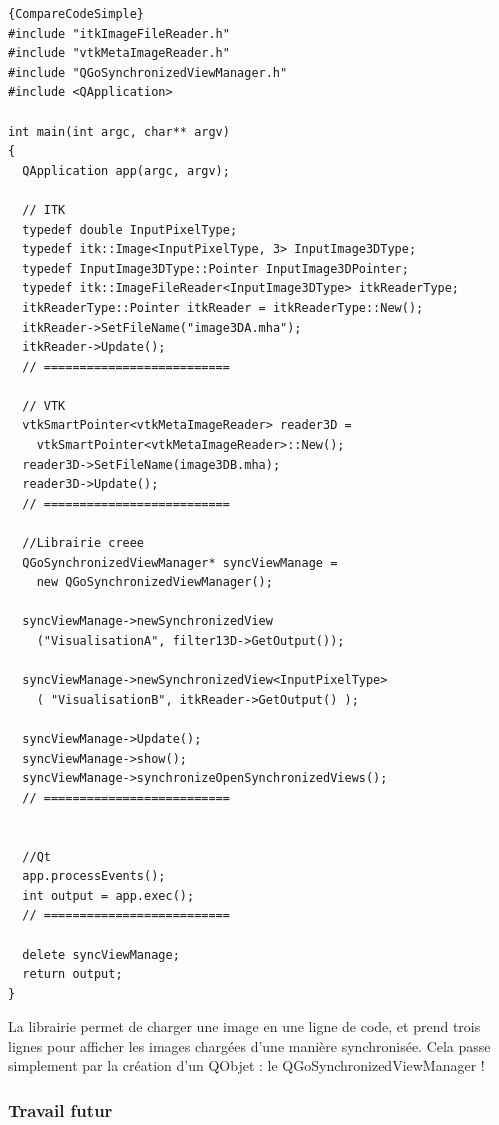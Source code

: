 \large
  \begin{lstlisting}[title={Utilisation simple de la librairie de comparaison d'images :\\Ce code permet d'ouvrir deux images : l'une provenant de la librairie ITK, et l'autre de VTK, et de synchroniser leur visualisation.}, label=SimpleCodeCompare]{CompareCodeSimple}
#include "itkImageFileReader.h"
#include "vtkMetaImageReader.h"
#include "QGoSynchronizedViewManager.h"
#include <QApplication>

int main(int argc, char** argv)
{
  QApplication app(argc, argv);

  // ITK
  typedef double InputPixelType;
  typedef itk::Image<InputPixelType, 3> InputImage3DType;
  typedef InputImage3DType::Pointer InputImage3DPointer;
  typedef itk::ImageFileReader<InputImage3DType> itkReaderType;
  itkReaderType::Pointer itkReader = itkReaderType::New();
  itkReader->SetFileName("image3DA.mha");
  itkReader->Update();
  // ==========================

  // VTK
  vtkSmartPointer<vtkMetaImageReader> reader3D = 
    vtkSmartPointer<vtkMetaImageReader>::New();
  reader3D->SetFileName(image3DB.mha);
  reader3D->Update();
  // ==========================

  //Librairie creee
  QGoSynchronizedViewManager* syncViewManage =
    new QGoSynchronizedViewManager();

  syncViewManage->newSynchronizedView
    ("VisualisationA", filter13D->GetOutput());

  syncViewManage->newSynchronizedView<InputPixelType>
    ( "VisualisationB", itkReader->GetOutput() );
    
  syncViewManage->Update();
  syncViewManage->show();
  syncViewManage->synchronizeOpenSynchronizedViews();
  // ==========================


  //Qt
  app.processEvents();
  int output = app.exec();
  // ==========================
  
  delete syncViewManage;
  return output;
}
  \end{lstlisting}
\normalsize
La librairie permet de charger une image en une ligne de code,
et prend trois lignes pour afficher les images chargées d'une manière synchronisée.
Cela passe simplement par la création d'un QObjet : le QGoSynchronizedViewManager !


\subsubsection*{Travail futur}

